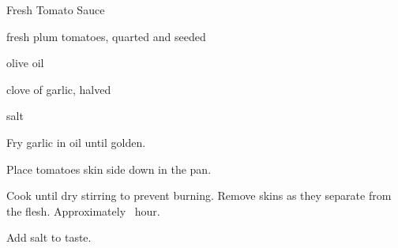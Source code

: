\begin{recipe}{Fresh Tomato Sauce}{}{}

\begin{ingredients}
\item fresh plum tomatoes, quarted and seeded
\item olive oil
\item clove of garlic, halved
\item salt
\end{ingredients}

\begin{directions}
\item Fry garlic in oil until golden.
\item Place tomatoes skin side down in the pan.
\item Cook until dry stirring to prevent burning. Remove skins as they separate from the flesh. Approximately \half~hour.
\item Add salt to taste.
\end{directions}

\end{recipe}
